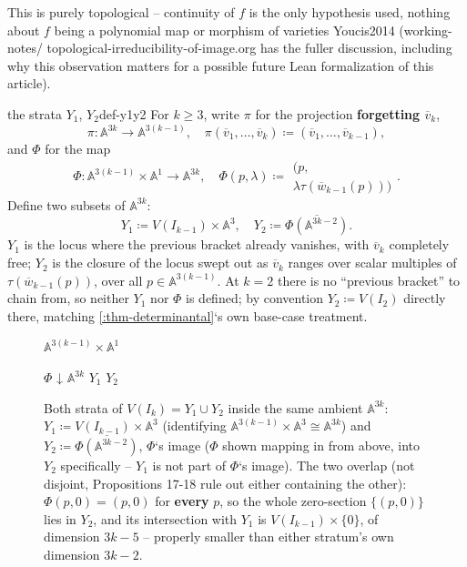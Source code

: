 \documentclass[a4paper,11pt]{scrartcl}
\begin{document}
This is purely topological -- continuity of \(f\) is the only hypothesis used, nothing about \(f\) being a polynomial map or morphism of varieties Youcis2014 (working-notes/ topological-irreducibility-of-image.org has the fuller discussion, including why this observation matters for a possible future Lean formalization of this article).

\begin{definition}{the strata \(Y_{1}\), \(Y_{2}\)}{def-y1y2} For \(k \geq 3\), write \(\pi\) for the projection \textbf{forgetting \({\overline{v}}_{k}\)}, \[\pi:\mathbb{A}^{3k} \rightarrow \mathbb{A}^{3(k - 1)},\quad\pi({\overline{v}}_{1},\ldots,{\overline{v}}_{k}) ≔ \left( {\overline{v}}_{1},\ldots,{\overline{v}}_{k - 1} \right),\] and \(\Phi\) for the map \[\Phi:\mathbb{A}^{3(k - 1)} \times \mathbb{A}^{1} \rightarrow \mathbb{A}^{3k},\quad\Phi(p,\lambda) ≔ \left. \begin{array}{r}
(p, \\
\lambda\tau({\overline{w}}_{k - 1}(p)))
\end{array} \right..\] Define two subsets of \(\mathbb{A}^{3k}\): \[Y_{1} ≔ V\left( I_{k - 1} \right) \times \mathbb{A}^{3},\quad Y_{2} ≔ \overline{\Phi(\mathbb{A}^{3k - 2})}.\] \(Y_{1}\) is the locus where the previous bracket already vanishes, with \({\overline{v}}_{k}\) completely free; \(Y_{2}\) is the closure of the locus swept out as \({\overline{v}}_{k}\) ranges over scalar multiples of \(\tau({\overline{w}}_{k - 1}(p))\), over all \(p \in \mathbb{A}^{3(k - 1)}\). At \(k = 2\) there is no ``previous bracket'' to chain from, so neither \(Y_{1}\) nor \(\Phi\) is defined; by convention \(Y_{2} ≔ V\left( I_{2} \right)\) directly there, matching \cref{:thm-determinantal}`s own base-case treatment.

\end{definition} \protect{}\label{def-y1y2}{}

\begin{figure}
\centering
\(\mathbb{A}^{3(k - 1)} \times \mathbb{A}^{1}\)

\(\Phi\) ↓ { \(\mathbb{A}^{3k}\) { \(Y_{1}\) } { \(Y_{2}\) } }
\caption{Both strata of \(V\left( I_{k} \right) = Y_{1} \cup Y_{2}\) inside the same ambient \(\mathbb{A}^{3k}\): \(Y_{1} ≔ V\left( I_{k - 1} \right) \times \mathbb{A}^{3}\) (identifying \(\mathbb{A}^{3(k - 1)} \times \mathbb{A}^{3} \cong \mathbb{A}^{3k}\)) and \(Y_{2} ≔ \overline{\Phi(\mathbb{A}^{3k - 2})}\), \(\Phi\)`s image (\(\Phi\) shown mapping in from above, into \(Y_{2}\) specifically -- \(Y_{1}\) is not part of \(\Phi\)`s image). The two overlap (not disjoint, Propositions 17-18 rule out either containing the other): \(\Phi(p,0) = (p,0)\) for \textbf{every} \(p\), so the whole zero-section \(\{(p,0)\}\) lies in \(Y_{2}\), and its intersection with \(Y_{1}\) is \(V\left( I_{k - 1} \right) \times \{ 0\}\), of dimension \(3k - 5\) -- properly smaller than either stratum's own dimension \(3k - 2\).}
\end{figure}
\end{document}
